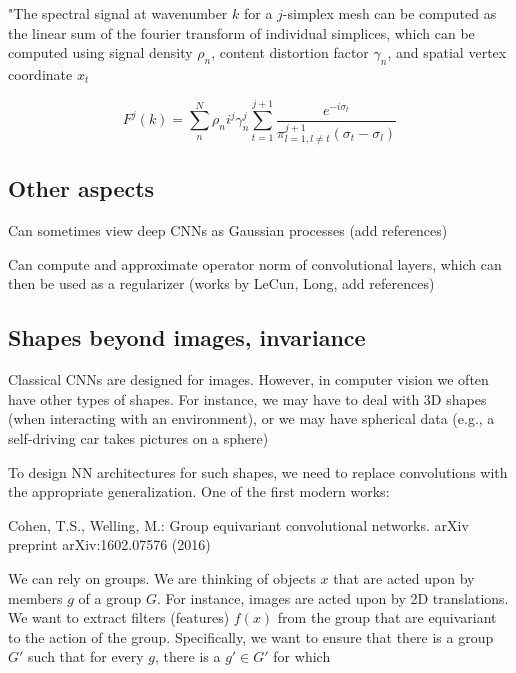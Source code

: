\documentclass[english]{article}
\begin{document}
"The spectral signal at wavenumber $k$ for a $j$-simplex mesh can be computed as the linear sum of the fourier transform of individual simplices, which can be computed using signal density $\rho_n$, content distortion factor 
$\gamma_n$, and spatial vertex coordinate $x_t$

$$F^j(k) =
\sum^N_n
\rho_n i^j \gamma^j_n
\sum^{j+1}_{t=1}
\frac{e^{-i\sigma_t}}
{\pi^{j+1}_{l=1,l\neq t} (\sigma_t - \sigma_l)}
$$



\eitem 



\subsection{Other aspects}
\benum
\item Can sometimes view deep CNNs as Gaussian processes (add references)

\item Can compute and approximate operator norm of convolutional layers, which can then be used as a regularizer (works by LeCun, Long, add references) 

\eenum



\subsection{Shapes beyond images, invariance}
%
\bitem
\item Classical CNNs are designed for images. However, in computer vision we often have other types of shapes. For instance, we may have to deal with 3D shapes (when interacting with an environment), or we may have spherical data (e.g., a self-driving car takes pictures on a sphere)

\item To design NN architectures for such shapes, we need to replace convolutions with the appropriate generalization. One of the first modern works: 


Cohen, T.S., Welling, M.: Group equivariant convolutional networks. arXiv
preprint arXiv:1602.07576 (2016)

\item We can rely on groups. We are thinking of objects $x$ that are acted upon by members $g$ of a group $G$. For instance, images are acted upon by 2D translations. We want to extract filters (features) $f(x)$ from the group that are equivariant to the action of the group. Specifically, we want to ensure that there is a group $G'$ such that for every $g$, there is a $g'\in G'$ for which
\end{document}
